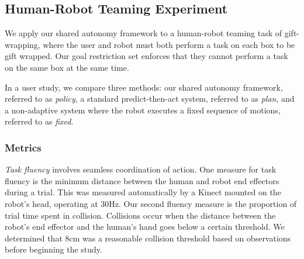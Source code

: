 \subsection{Human-Robot Teaming Experiment}
\label{sec:experiment_iros_2016}

\graphicspath{{./}{./images_iros_2016/}}

We apply our shared autonomy framework to a human-robot teaming task of gift-wrapping, where the user and robot must both perform a task on each box to be gift wrapped. Our goal restriction set enforces that they cannot perform a task on the same box at the same time. 

In a user study, we compare three methods: our shared autonomy framework, referred to as \emph{policy}, a standard predict-then-act system, referred to as \emph{plan}, and a non-adaptive system where the robot executes a fixed sequence of motions, referred to as \emph{fixed}.

%

\subsubsection{Metrics}

\emph{Task fluency} involves seamless coordination of action. One measure for task fluency is the minimum distance between the human and robot end effectors during a trial. This was measured automatically by a Kinect mounted on the robot's head, operating at 30Hz. Our second fluency measure is the proportion of trial time spent in collision. Collisions occur when the distance between the robot's end effector and the human's hand goes below a certain threshold. We determined that 8cm was a reasonable collision threshold based on observations before beginning the study. 

